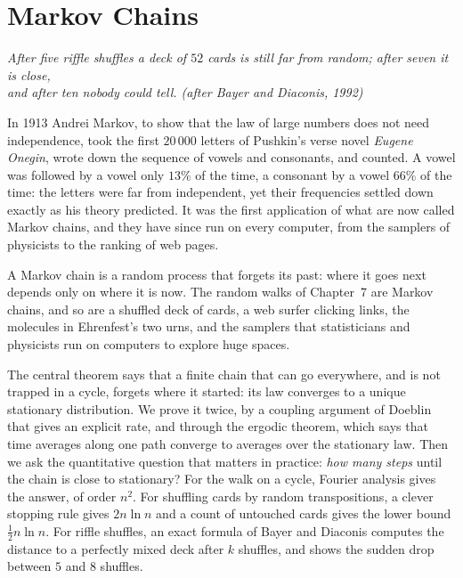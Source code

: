 \chapter{Markov Chains}

\begin{center}\itshape
After five riffle shuffles a deck of $52$ cards is still far from random; after seven it is close,\\
and after ten nobody could tell. \upshape(after Bayer and Diaconis, 1992)
\end{center}

In 1913 Andrei Markov, to show that the law of large numbers does not need independence, took the first $20\,000$ letters of Pushkin's verse novel
\emph{Eugene Onegin}, wrote down the sequence of vowels and consonants, and counted. A vowel was followed by a vowel only $13\%$ of the time, a
consonant by a vowel $66\%$ of the time: the letters were far from independent, yet their frequencies settled down exactly as his theory predicted. It
was the first application of what are now called Markov chains, and they have since run on every computer, from the samplers of physicists to the
ranking of web pages.

A Markov chain is a random process that forgets its past: where it goes next depends only on where it is now. The
random walks of Chapter~7 are Markov chains, and so are a shuffled deck of cards, a web surfer clicking links, the
molecules in Ehrenfest's two urns, and the samplers that statisticians and physicists run on computers to explore
huge spaces.

The central theorem says that a finite chain that can go everywhere, and is not trapped in a cycle, forgets where it
started: its law converges to a unique stationary distribution. We prove it twice, by a coupling argument of
Doeblin that gives an explicit rate, and through the ergodic theorem, which says that time averages along one path
converge to averages over the stationary law. Then we ask the quantitative question that matters in practice:
\emph{how many steps} until the chain is close to stationary? For the walk on a cycle, Fourier analysis gives the answer,
of order $n^2$. For shuffling cards by random transpositions, a clever stopping rule gives $2n\ln n$ and a count of
untouched cards gives the lower bound $\frac12n\ln n$. For riffle shuffles, an exact formula of Bayer and Diaconis computes the
distance to a perfectly mixed deck after $k$ shuffles, and shows the sudden drop between $5$ and $8$ shuffles.

